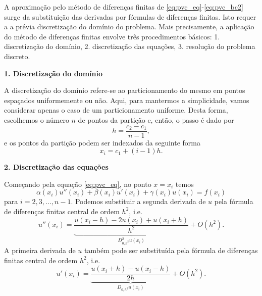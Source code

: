 A aproximação pelo método de diferenças finitas de \eqref{eq:pvc_eq}-\eqref{eq:pvc_bc2} surge da substituição das derivadas por fórmulas de diferenças finitas. Isto requer a a prévia discretização do domínio do problema. Mais precisamente, a aplicação do método de diferenças finitas envolve três procedimentos básicos: 1. discretização do domínio, 2. discretização das equações, 3. resolução do problema discreto.

\begin{flushleft}
  {\bf 1. Discretização do domínio}
\end{flushleft}

A discretização do domínio refere-se ao particionamento do mesmo em pontos espaçados uniformemente ou não. Aqui, para mantermos a simplicidade, vamos considerar apenas o caso de um particionamento uniforme. Desta forma, escolhemos o número $n$ de pontos da partição e, então, o passo é dado por
\begin{equation}
  h = \frac{c_2-c_1}{n-1},
\end{equation}
e os pontos da partição podem ser indexados da seguinte forma
\begin{equation}
  x_i = c_1 + (i-1)h.
\end{equation}

\begin{flushleft}
  {\bf 2. Discretização das equações}
\end{flushleft}

Começando pela equação \eqref{eq:pvc_eq}, no ponto $x=x_i$ temos
\begin{equation}
  \alpha(x_i) u''(x_i) + \beta(x_i) u'(x_i) + \gamma(x_i) u(x_i) = f(x_i) \label{eq:pvc_eq_no_ponto}
\end{equation}
para $i=2, 3, \dotsc, n-1$. Podemos substituir a segunda derivada de $u$ pela fórmula de diferenças finitas central de ordem $h^2$, i.e.
\begin{equation}
  u''(x_i) = \underbrace{\frac{u(x_i-h) - 2u(x_i) + u(x_i+h)}{h^2}}_{D_{0,h^2}^2u(x_i)} + O(h^2).
\end{equation}
A primeira derivada de $u$ também pode ser substituída pela fórmula de diferenças finitas central de ordem $h^2$, i.e.
\begin{equation}
  u'(x_i) = \underbrace{\frac{u(x_i+h)-u(x_i-h)}{2h}}_{D_{0,h^2}u(x_i)} + O(h^2).
\end{equation}

